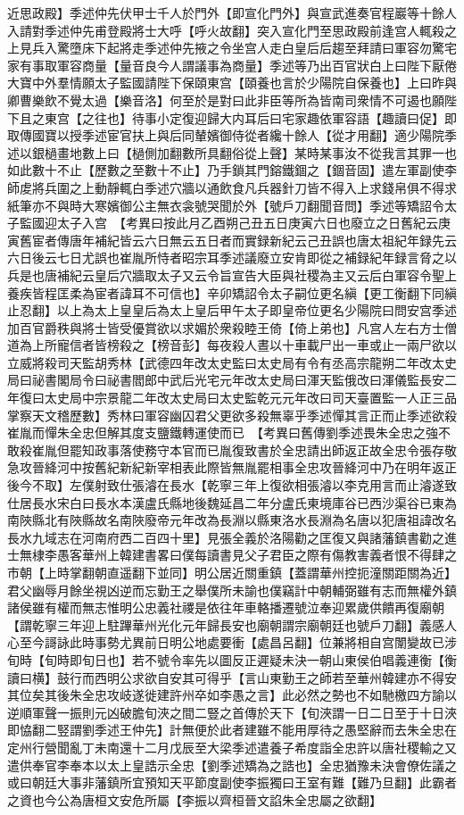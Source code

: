近思政殿】季述仲先伏甲士千人於門外【即宣化門外】與宣武進奏官程巖等十餘人入請對季述仲先甫登殿將士大呼【呼火故翻】突入宣化門至思政殿前逢宫人輒殺之上見兵入驚墮床下起將走季述仲先掖之令坐宫人走白皇后后趨至拜請曰軍容勿驚宅家有事取軍容商量【量音良今人謂議事為商量】季述等乃出百官狀白上曰陛下厭倦大寶中外羣情願太子監國請陛下保頤東宫【頤養也言於少陽院自保養也】上曰昨與卿曹樂飲不覺太過【樂音洛】何至於是對曰此非臣等所為皆南司衆情不可遏也願陛下且之東宫【之往也】待事小定復迎歸大内耳后曰宅家趣依軍容語【趣讀曰促】即取傳國寶以授季述宦官扶上與后同輦嬪御侍從者纔十餘人【從才用翻】適少陽院季述以銀檛畫地數上曰【檛側加翻數所具翻俗從上聲】某時某事汝不從我言其罪一也如此數十不止【歷數之至數十不止】乃手鎖其門鎔鐵錮之【錮音固】遣左軍副使李師䖍將兵圍之上動靜輒白季述穴牆以通飲食凡兵器針刀皆不得入上求錢帛俱不得求紙筆亦不與時大寒嬪御公主無衣衾號哭聞於外【號戶刀翻聞音問】季述等矯詔令太子監國迎太子入宫　【考異曰按此月乙酉朔己丑五日庚寅六日也廢立之日舊紀云庚寅舊宦者傳唐年補紀皆云六日無云五日者而實録新紀云己丑誤也唐太祖紀年録先云六日後云七日尤誤也崔胤所恃者昭宗耳季述議廢立安肯即從之補録紀年録言脅之以兵是也唐補紀云皇后穴牆取太子又云令旨宣告大臣與社稷為主又云后白軍容令聖上養疾皆程匡柔為宦者諱耳不可信也】辛卯矯詔令太子嗣位更名縝【更工衡翻下同縝止忍翻】以上為太上皇皇后為太上皇后甲午太子即皇帝位更名少陽院曰問安宫季述加百官爵秩與將士皆受優賞欲以求媚於衆殺睦王倚【倚上弟也】凡宫人左右方士僧道為上所寵信者皆榜殺之【榜音彭】每夜殺人晝以十車載尸出一車或止一兩尸欲以立威將殺司天監胡秀林【武德四年改太史監曰太史局有令有丞高宗龍朔二年改太史局曰祕書閣局令曰祕書閻郎中武后光宅元年改太史局曰渾天監俄改曰渾儀監長安二年復曰太史局中宗景龍二年改太史局曰太史監乾元元年改曰司天臺置監一人正三品掌察天文稽歷數】秀林曰軍容幽囚君父更欲多殺無辜乎季述憚其言正而止季述欲殺崔胤而憚朱全忠但解其度支鹽鐵轉運使而已　【考異曰舊傳劉季述畏朱全忠之強不敢殺崔胤但罷知政事落使務守本官而已胤復致書於全忠請出師返正故全忠令張存敬急攻晉絳河中按舊紀新紀新宰相表此際皆無胤罷相事全忠攻晉絳河中乃在明年返正後今不取】左僕射致仕張濬在長水【乾寧三年上復欲相張濬以李克用言而止濬遂致仕居長水宋白曰長水本漢盧氏縣地後魏延昌二年分盧氏東境庫谷已西沙渠谷已東為南陜縣北有陜縣故名南陜廢帝元年改為長淵以縣東洛水長淵為名唐以犯唐祖諱改名長水九域志在河南府西二百四十里】見張全義於洛陽勸之匡復又與諸藩鎮書勸之進士無棣李愚客華州上韓建書畧曰僕每讀書見父子君臣之際有傷教害義者恨不得肆之市朝【上時掌翻朝直遥翻下並同】明公居近關重鎮【蓋謂華州控扼潼關距關為近】君父幽辱月餘坐視凶逆而忘勤王之舉僕所未諭也僕竊計中朝輔弼雖有志而無權外鎮諸侯雖有權而無志惟明公忠義社禝是依往年車輅播遷號泣奉迎累歲供饋再復廟朝【謂乾寧三年迎上駐蹕華州光化元年歸長安也廟朝謂宗廟朝廷也號戶刀翻】義感人心至今謌詠此時事勢尤異前日明公地處要衝【處昌呂翻】位兼將相自宫闈變故已涉旬時【旬時即旬日也】若不號令率先以圖反正遲疑未決一朝山東侯伯唱義連衡【衡讀曰横】鼓行而西明公求欲自安其可得乎【言山東勤王之師若至華州韓建亦不得安其位矣其後朱全忠攻岐遂徙建許州卒如李愚之言】此必然之勢也不如馳檄四方諭以逆順軍聲一振則元凶破膽旬浹之間二豎之首傳於天下【旬浹謂一日二日至于十日浹即恊翻二竪謂劉季述王仲先】計無便於此者建雖不能用厚待之愚堅辭而去朱全忠在定州行營聞亂丁未南還十二月戊辰至大梁季述遣養子希度詣全忠許以唐社稷輸之又遣供奉官李奉本以太上皇誥示全忠【劉季述矯為之誥也】全忠猶豫未決會僚佐議之或曰朝廷大事非藩鎮所宜預知天平節度副使李振獨曰王室有難【難乃旦翻】此霸者之資也今公為唐桓文安危所屬【李振以齊桓晉文諂朱全忠屬之欲翻】
